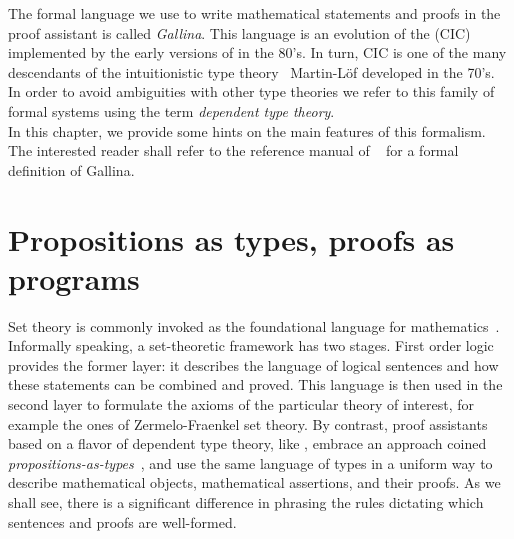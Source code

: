 The formal language we use to write
mathematical statements and proofs in the \Coq{} proof assistant
is called \emph{Gallina}.
This language is an evolution of the \emph{\mcbCIC{}}
(CIC)~\cite{coquand:huet:88,CoPa89} implemented
by the early versions of \Coq{} in the 80's. In turn, CIC is one of the many
descendants of the intuitionistic type theory~\cite{ITT} Martin-Löf developed in
the 70's. In order to avoid ambiguities with other type theories we refer to
this family of formal systems using the term \emph{dependent type theory}.\\
In this
chapter, we provide some hints on the main features of this
formalism. The interested reader shall refer to the reference manual
of \Coq{}~\cite{Coq:manual} for a formal definition of Gallina. %


\section{Propositions as types, proofs as programs}\label{sec:patpap}

Set theory is commonly invoked as the foundational language for
mathematics~\cite{bourbaki-sets}. Informally speaking, a
set-theoretic framework has two stages. First order logic provides
the former layer: it describes the language of logical sentences and how
these statements can be combined and proved. This language is then
used in the second layer to formulate the axioms of the particular
theory of interest, for example the ones of Zermelo-Fraenkel set theory.
By contrast, proof assistants based on a flavor of dependent
type theory, like \Coq{}, embrace an approach coined
\emph{propositions-as-types}~\cite{ch}, and use the same language of
types in a uniform way to describe mathematical objects, mathematical
assertions, and their proofs.  As we shall see, there is a significant 
difference in phrasing the rules dictating which sentences and proofs 
are well-formed.


